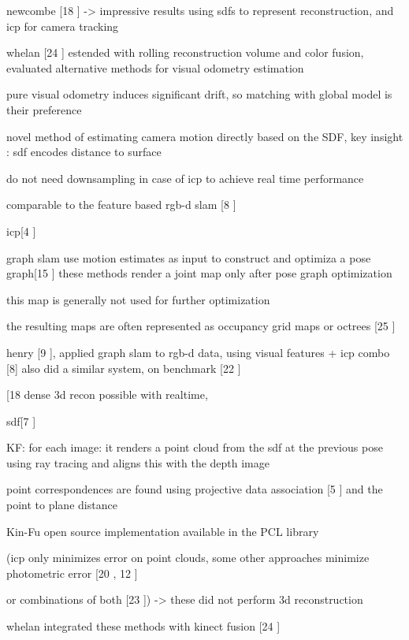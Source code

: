 newcombe [18 \cite{Newcombe11Kinectfusion} ] -> impressive results using sdfs to represent reconstruction, and icp for camera tracking

whelan [24 \cite{Whelan13Robust}] estended with rolling reconstruction volume and color fusion, evaluated alternative methods for visual odometry estimation

pure visual odometry induces significant drift, so matching with global model is their preference

novel method of estimating camera motion directly based on the SDF, key insight : sdf encodes distance to surface

do not need downsampling in case of icp to achieve real time performance

comparable to the feature based rgb-d slam [8 \cite{Endres12Evaluation}]

icp[4 \cite{Besl92Method}]

graph slam use motion estimates as input to construct and optimiza a pose graph[15 \cite{Kummerle11G}] these methods render a joint map only after pose graph optimization

this map is generally not used for further optimization

the resulting maps are often represented as occupancy grid maps or octrees [25 \cite{Wurm10Octomap}]

henry [9 \cite{Henry10Rgb}], applied graph slam to rgb-d data, using visual features + icp combo [8] also did a similar system, on benchmark [22 \cite{Sturm12Benchmark}]

[18 \cite{Newcombe11Kinectfusion} dense 3d recon possible with realtime, 

sdf[7 \cite{Curless96Volumetric}]

KF: for each image:
it renders a point cloud from the sdf at the previous pose using ray tracing and aligns this with the depth image


point correspondences are found using projective data association [5 \cite{Blais95Registering}] and the point to plane distance

Kin-Fu open source implementation available in the PCL library

(icp only minimizes error on point clouds, some other approaches minimize photometric error [20 \cite{Steinbrucker11Real}, 12 \cite{Kerl13Robust}]

or combinations of both [23 \cite{Tykkala11Direct}]) -> these did not perform 3d reconstruction

whelan integrated these methods with kinect fusion [24 \cite{Whelan13Robust}]

